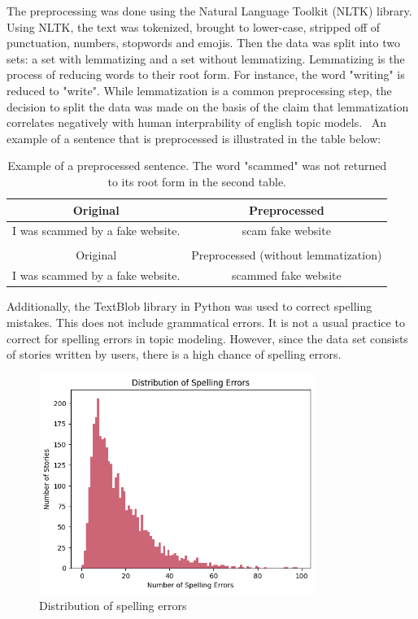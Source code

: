 The preprocessing was done using the Natural Language Toolkit (NLTK) library. Using NLTK, the text was tokenized, brought to lower-case, stripped off of punctuation, numbers, stopwords and emojis. Then the data was split into two sets: a set with lemmatizing and a set without lemmatizing. Lemmatizing is the process of reducing words to their root form. For instance, the word "writing" is reduced to "write". While lemmatization is a common preprocessing step, the decision to split the data was made on the basis of the claim that lemmatization correlates negatively with human interprability of english topic models.~\cite{schofield2016comparing} An example of a sentence that is preprocessed is illustrated in the table below:


\begin{table}[h]
    \centering
    \begin{tabular}{cc}
        Original & Preprocessed \\ \hline
        I was scammed by a fake website. & scam fake website \\
        \\
        Original & Preprocessed (without lemmatization) \\ \hline
        I was scammed by a fake website. & scammed fake website \\
    \end{tabular}
    \caption{Example of a preprocessed sentence. The word "scammed" was not returned to its root form in the second table.}
    \label{tab:preprocessing}
\end{table}

Additionally, the TextBlob library in Python was used to correct spelling mistakes. This does not include grammatical errors. It is not a usual practice to correct for spelling errors in topic modeling. However, since the data set consists of stories written by users, there is a high chance of spelling errors. 

\begin{figure}[h]
    \centering
    \includegraphics[width=0.8\textwidth]{resources/spelling_mistakes_distribution.png}
    \caption{Distribution of spelling errors}
    \label{fig:spelling_error_distribution}
\end{figure}


